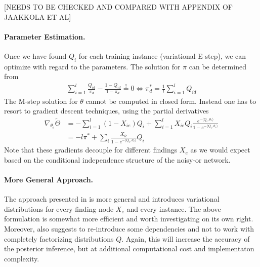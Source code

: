 \documentclass{article}
\begin{document}
[NEEDS TO BE CHECKED AND COMPARED WITH APPENDIX OF JAAKKOLA ET AL]

\paragraph{Parameter Estimation.}
Once we have found $Q_i$ for each training instance (variational E-step), we can optimize  with regard to the parameters. The solution for $\pi$ can be determined from 
\begin{align}
\sum_{i=1}^l \frac{Q_{id}}{\pi_d} - \frac{1-Q_{id}}{1-\pi_d} \stackrel != 0 \iff \pi^*_d = \frac 1l \sum_{i=1}^l Q_{id} 
\end{align}
The M-step solution for $\theta$ cannot be computed in closed form. Instead one has to resort to gradient descent techniques, using the partial derivatives  
\begin{align}
\nabla_{\theta_e} \tilde \Theta & =  -  \sum_{i=1}^l (1-X_{ie}) Q_{i} + \sum_{i=1}^l X_{ie} Q_{i} \frac{e^{-\langle Q_i, \theta_e \rangle}}{1 - e^{-\langle Q_i, \theta_e \rangle}}  \\
& = -l \pi^* + \sum_{i}   \frac{X_{ie}}{1 - e^{-\langle Q_i, \theta_e \rangle}} Q_{i}
\end{align}
Note that these gradients decouple for different findings $X_e$ as we would expect based on the conditional independence structure of the noisy-or network. 

\paragraph{More General Approach.} The approach presented in \cite{jaakkola1999variational} is more general and introduces variational distributions for every finding node $X_e$ and every instance. The above formulation is somewhat more efficient and worth investigating on its own right. Moreover, \cite{jaakkola1999variational} also suggests to re-introduce some dependencies and not to work with completely factorizing distributions $Q$. Again, this will increase the accuracy of the posterior inference, but at additional computational cost and implementaton complexity. 
\end{document}
